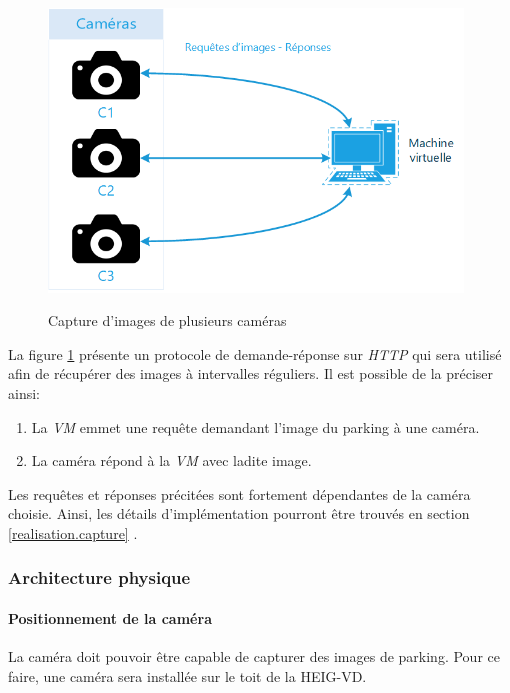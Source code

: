 \begin{figure}[!ht]
    \includegraphics[width=110mm]{img/conception/logic_arch.png}
    \label{fig:capture_cameras}
    \centering
    \caption{Capture d'images de plusieurs caméras}
\end{figure}

La figure \ref{fig:capture_cameras} présente un protocole de demande-réponse sur \textit{HTTP} qui sera utilisé afin de récupérer des images à intervalles réguliers. Il est possible de la préciser ainsi:

\begin{enumerate}
    \item La \textit{VM} emmet une requête demandant l'image du parking à une caméra. 
    \item La caméra répond à la \textit{VM} avec ladite image.
\end{enumerate}

Les requêtes et réponses précitées sont fortement dépendantes de la caméra choisie. Ainsi, les détails d'implémentation pourront être trouvés en section \ref{realisation.capture} .


\subsubsection{Architecture physique}\label{conception.architecture.camera.physique}
\paragraph{Positionnement de la caméra}\label{conception.architecture.camera.physique.position}
La caméra doit pouvoir être capable de capturer des images de parking. Pour ce faire, une caméra sera installée sur le toit de la HEIG-VD. 

